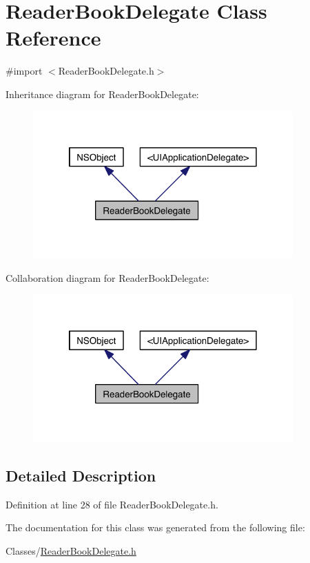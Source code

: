 \hypertarget{interface_reader_book_delegate}{\section{Reader\-Book\-Delegate Class Reference}
\label{d1/dfc/interface_reader_book_delegate}
}


{\ttfamily \#import $<$Reader\-Book\-Delegate.\-h$>$}



Inheritance diagram for Reader\-Book\-Delegate\-:
\nopagebreak
\begin{figure}[H]
\begin{center}
\leavevmode
\includegraphics[width=283pt]{db/df0/interface_reader_book_delegate__inherit__graph}
\end{center}
\end{figure}


Collaboration diagram for Reader\-Book\-Delegate\-:
\nopagebreak
\begin{figure}[H]
\begin{center}
\leavevmode
\includegraphics[width=283pt]{de/d1f/interface_reader_book_delegate__coll__graph}
\end{center}
\end{figure}


\subsection{Detailed Description}


Definition at line 28 of file Reader\-Book\-Delegate.\-h.



The documentation for this class was generated from the following file\-:\begin{DoxyCompactItemize}
\item 
Classes/\hyperlink{_reader_book_delegate_8h}{Reader\-Book\-Delegate.\-h}\end{DoxyCompactItemize}
